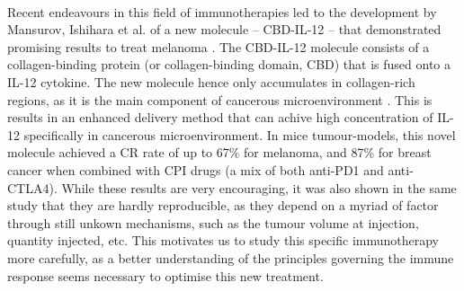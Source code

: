 \documentclass[11pt]{article}
\begin{document}
~ %
\par Recent endeavours in this field of immunotherapies led to the development by Mansurov, Ishihara et al. of a new molecule -- CBD-IL-12 -- that demonstrated promising results to treat melanoma \cite{cbdil12}. The CBD-IL-12  molecule consists of a collagen-binding protein (or collagen-binding domain, CBD) that is fused onto a IL-12 cytokine. The new molecule hence only accumulates in collagen-rich regions, as it is the main component of cancerous microenvironment \cite{collagenInCancer}. This is results in an enhanced delivery method that can achive high concentration of IL-12 specifically in cancerous microenvironment. In mice tumour-models, this novel molecule achieved a CR rate of up to 67\% for melanoma, and 87\% for breast cancer when combined with CPI drugs (a mix of both anti-PD1 and anti-CTLA4). While these results are very encouraging, it was also shown in the same study that they are hardly reproducible, as they depend on a myriad of factor through still unkown mechanisms, such as the tumour volume at injection, quantity injected, etc. This motivates us to study this specific immunotherapy more carefully, as a better understanding of the principles governing the immune response seems necessary to optimise this new treatment.
\end{document}
